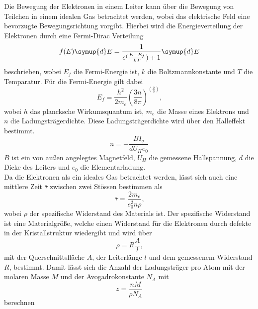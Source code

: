 \noindent Die Bewegung der Elektronen in einem Leiter kann über die Bewegung von Teilchen in einem idealen Gas betrachtet
werden, wobei das elektrische Feld eine bevorzugte Bewegungsrichtung vorgibt. Hierbei wird die Energieverteilung
der Elektronen durch eine Fermi-Dirac Verteilung
    \begin{equation}
         f(E)\symup{d}E=\frac{1}{e^(\frac{E-E_f}{kT})+1}\symup{d}E
         \label{eqn:fermidirac}
    \end{equation}   
\noindent beschrieben, wobei $E_f$ die Fermi-Energie ist, $k$ die Boltzmannkonstante und $T$ die Temparatur. Für die 
Fermi-Energie gilt dabei
\begin{equation}
    E_f=\frac{h^2}{2m_e}(\frac{3n}{8\pi})^(\frac{2}{3}) \text{,}
    \label{eqn:fermienergie}
\end{equation}
\noindent wobei $h$ das plancksche Wirkumsquantum ist, $m_e$ die Masse eines Elektrons und $n$ die Ladungsträgerdichte.
Diese Ladungsträgerdichte wird über den Halleffekt bestimmt.
\begin{equation}
    n=-\frac{BI_q}{dU_He_0}
    \label{eqn:ladungsdichte}
\end{equation}
\noindent $B$ ist ein von außen angelegtes Magnetfeld, $U_H$ die gemessene Hallspannung, $d$ die Dicke des Leiters und $e_0$
die Elementarladung.\\
\noindent Da die Elektronen als ein ideales Gas betrachtet werden, lässt sich auch eine mittlere Zeit $\bar{\tau}$ 
zwischen zwei Stössen bestimmen als
\begin{equation}
    \bar{\tau}=\frac{2m_e}{e_0^2n\rho}\text{,}
    \label{eqn:mittlere_Flugdauer}
\end{equation}
\noindent wobei $\rho$ der spezifische Widerstand des Materials ist. Der spezifische Widerstand ist eine Materialgröße,
welche einen Widerstand für die Elektronen durch defekte in der Kristallstruktur wiedergibt und wird über
\begin{equation}
    \rho=R\frac{A}{l}
    \label{eqn:spezifischer_widerstand}\text{,}
\end{equation}
\noindent mit der Querschnittsfläche $A$, der Leiterlänge $l$ und dem gemessenem Widerstand $R$, bestimmt.
Damit lässt sich die Anzahl der Ladungsträger pro Atom mit der molaren Masse $M$ und der Avogadrokonstante $N_A$ mit
\begin{equation}
    z=\frac{nM}{\rho N_A}
    \label{ladung_pro_atom}
\end{equation}
\noindent berechnen\\
